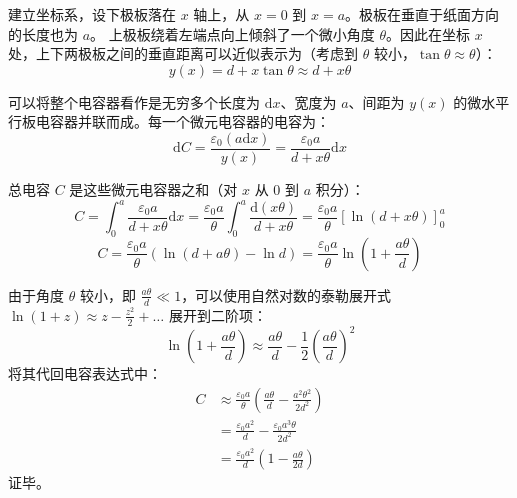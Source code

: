 \begin{solution}
建立坐标系，设下极板落在 $x$ 轴上，从 $x = 0$ 到 $x = a$。极板在垂直于纸面方向的长度也为 $a$。
上极板绕着左端点向上倾斜了一个微小角度 $\theta$。因此在坐标 $x$ 处，上下两极板之间的垂直距离可以近似表示为（考虑到 $\theta$ 较小，$\tan\theta \approx \theta$）：
$$ y(x) = d + x \tan\theta \approx d + x\theta $$

可以将整个电容器看作是无穷多个长度为 $\mathrm{d}x$、宽度为 $a$、间距为 $y(x)$ 的微水平行板电容器并联而成。每一个微元电容器的电容为：
$$ \mathrm{d}C = \frac{\varepsilon_0 (a \mathrm{d}x)}{y(x)} = \frac{\varepsilon_0 a}{d + x\theta} \mathrm{d}x $$

总电容 $C$ 是这些微元电容器之和（对 $x$ 从 $0$ 到 $a$ 积分）：
$$ C = \int_0^a \frac{\varepsilon_0 a}{d + x\theta} \mathrm{d}x = \frac{\varepsilon_0 a}{\theta} \int_0^a \frac{\mathrm{d}(x\theta)}{d + x\theta} = \frac{\varepsilon_0 a}{\theta} \left[ \ln(d + x\theta) \right]_0^a $$
$$ C = \frac{\varepsilon_0 a}{\theta} \left( \ln(d + a\theta) - \ln d \right) = \frac{\varepsilon_0 a}{\theta} \ln\left( 1 + \frac{a\theta}{d} \right) $$

由于角度 $\theta$ 较小，即 $\frac{a\theta}{d} \ll 1$，可以使用自然对数的泰勒展开式 $\ln(1 + z) \approx z - \frac{z^2}{2} + \dots$ 展开到二阶项：
$$ \ln\left( 1 + \frac{a\theta}{d} \right) \approx \frac{a\theta}{d} - \frac{1}{2}\left(\frac{a\theta}{d}\right)^2 $$
将其代回电容表达式中：
\begin{align*}
C &\approx \frac{\varepsilon_0 a}{\theta} \left( \frac{a\theta}{d} - \frac{a^2\theta^2}{2d^2} \right) \\
  &= \frac{\varepsilon_0 a^2}{d} - \frac{\varepsilon_0 a^3 \theta}{2d^2} \\
  &= \frac{\varepsilon_0 a^2}{d} \left( 1 - \frac{a\theta}{2d} \right)
\end{align*}
证毕。
\end{solution}

